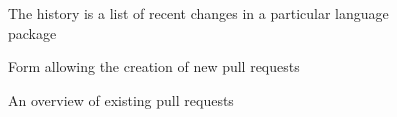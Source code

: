 \begin{figure}[h!]
 \centering
 \caption{The history is a list of recent changes in a particular language package}
 \label{fig:history}
\end{figure}

\begin{figure}[h!]
 \centering
 \caption{Form allowing the creation of new pull requests}
 \label{fig:open-new-pr}
\end{figure}

\begin{figure}[h!]
 \centering
 \caption{An overview of existing pull requests}
 \label{fig:list-of-prs}
\end{figure}
